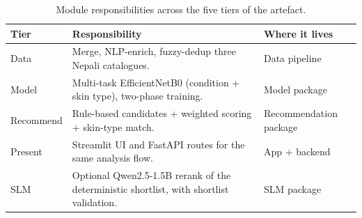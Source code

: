 \documentclass[11pt,a4paper]{article}
\begin{document}
\begin{table}[!ht]
  \centering
  \caption{Module responsibilities across the five tiers of the artefact.}
  \label{tab:modules}
  \begin{tabularx}{\linewidth}{@{}p{2.4cm} X p{4.0cm}@{}}
    \toprule
    \textbf{Tier} & \textbf{Responsibility} & \textbf{Where it lives} \\
    \midrule
    Data       & Merge, NLP-enrich, fuzzy-dedup three Nepali catalogues.            & Data pipeline \\
    Model      & Multi-task EfficientNetB0 (condition + skin type), two-phase training. & Model package \\
    Recommend  & Rule-based candidates + weighted scoring + skin-type match.        & Recommendation package \\
    Present    & Streamlit UI and FastAPI routes for the same analysis flow.        & App + backend \\
    SLM        & Optional Qwen2.5-1.5B rerank of the deterministic shortlist, with shortlist validation. & SLM package \\
    \bottomrule
  \end{tabularx}
\end{table}
\end{document}

